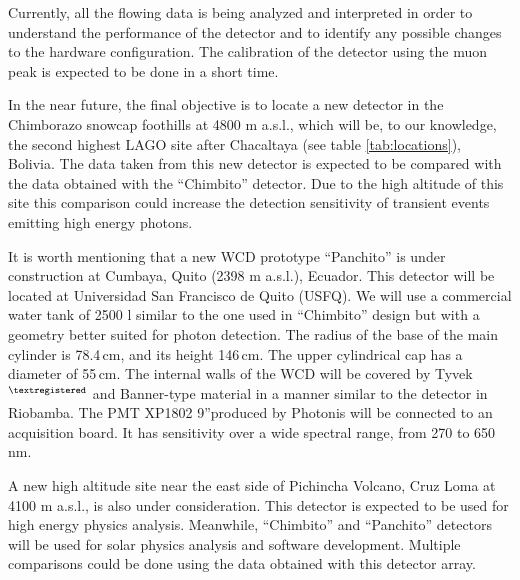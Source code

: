 Currently, all the flowing data is being analyzed and interpreted in order to
understand the performance of the detector and to identify any possible changes to
the hardware configuration. The calibration of the detector using the muon peak
is expected to be done in a short time.

In the near future, the final objective is to locate a new detector in the
Chimborazo snowcap foothills at 4800 m a.s.l., which will be, to our
knowledge, the second highest LAGO site after Chacaltaya (see table \ref{tab:locations}),
Bolivia. The data taken from this new detector is expected to be compared with
the data obtained with the ``Chimbito'' detector. Due to the high altitude of
this site  this comparison could increase the detection sensitivity of
transient events emitting high energy photons.

It is worth mentioning that a new WCD prototype ``Panchito'' is under
construction at Cumbaya, Quito (2398 m a.s.l.), Ecuador. This detector will be
located at Universidad San Francisco de Quito (USFQ). We will use a commercial
water tank of 2500 l similar to the one used in ``Chimbito'' design but with a
geometry better suited for photon detection. The radius of the base of the main
cylinder is 78.4\,cm, and its height 146\,cm. The upper cylindrical cap has a
diameter of 55\,cm. The internal walls of the WCD will be covered by
Tyvek$^{\textregistered}$ and Banner-type material in a manner similar to the
detector in Riobamba. The PMT XP1802 9''produced by Photonis will be connected
to an acquisition board. It has sensitivity over a wide spectral range, from
270 to 650\,nm.

A new high altitude site near the east side of Pichincha Volcano, Cruz Loma at
4100 m a.s.l., is also under consideration. This detector is expected to be used
for high energy physics analysis. Meanwhile, ``Chimbito'' and ``Panchito''
detectors will be used for solar physics analysis and software development.
Multiple comparisons could be done using the data obtained with this detector
array.

